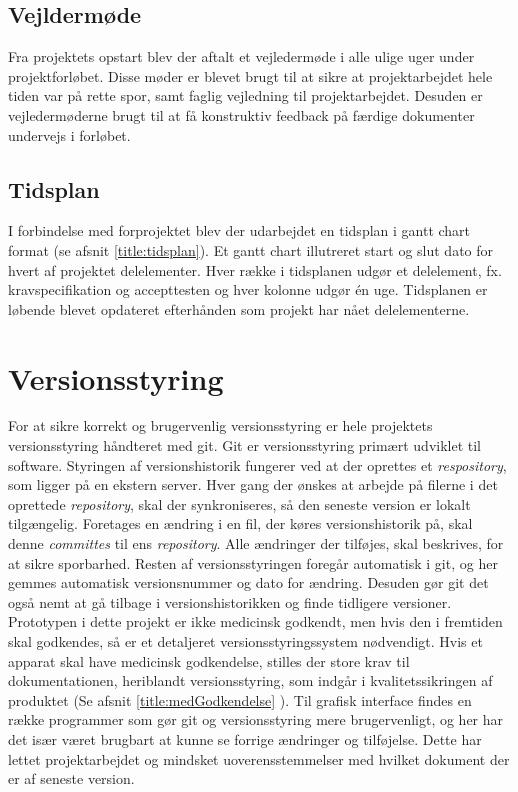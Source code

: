 \subsection{Vejldermøde}
Fra projektets opstart blev der aftalt et vejledermøde i alle ulige uger under projektforløbet. Disse møder er blevet brugt til at sikre at projektarbejdet hele tiden var på rette spor, samt faglig vejledning til projektarbejdet. Desuden er vejledermøderne brugt til at få konstruktiv feedback på færdige dokumenter undervejs i forløbet. 

\subsection{Tidsplan}
I forbindelse med forprojektet blev der udarbejdet en tidsplan i gantt chart format (se afsnit \ref{title:tidsplan}). Et gantt chart illutreret start og slut dato for hvert af projektet delelementer. Hver række i tidsplanen udgør et delelement, fx. kravspecifikation og accepttesten og hver kolonne udgør én uge. Tidsplanen er løbende blevet opdateret efterhånden som projekt har nået delelementerne. 

\section{Versionsstyring} \label{title:versionsstyring}
For at sikre korrekt og brugervenlig versionsstyring er hele projektets versionsstyring håndteret med git. Git er versionsstyring primært udviklet til software. Styringen af versionshistorik fungerer ved at der oprettes et \textit{respository}, som ligger på en ekstern server. Hver gang der ønskes at arbejde på filerne i det oprettede \textit{repository}, skal der synkroniseres, så den seneste version er lokalt tilgængelig. Foretages en ændring i en fil, der køres versionshistorik på, skal denne \textit{committes} til ens \textit{repository}. Alle ændringer der tilføjes, skal beskrives, for at sikre sporbarhed. Resten af versionsstyringen foregår automatisk i git, og her gemmes automatisk versionsnummer og dato for ændring. Desuden gør git det også nemt at gå tilbage i versionshistorikken og finde tidligere versioner. 
Prototypen i dette projekt er ikke medicinsk godkendt, men hvis den i fremtiden skal godkendes, så er et detaljeret versionsstyringssystem nødvendigt. Hvis et apparat skal have medicinsk godkendelse, stilles der store krav til dokumentationen, heriblandt versionsstyring, som indgår i kvalitetssikringen af produktet (Se afsnit \ref{title:medGodkendelse} ). 
Til grafisk interface findes en række programmer som gør git og versionsstyring mere brugervenligt, og her har det især været brugbart at kunne se forrige ændringer og tilføjelse. Dette har lettet projektarbejdet og mindsket uoverensstemmelser med hvilket dokument der er af seneste version. 

